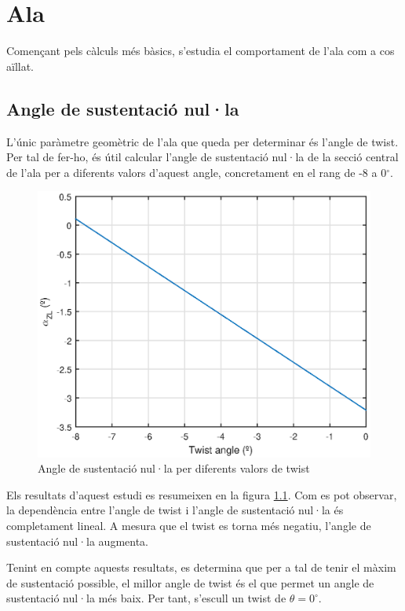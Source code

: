 \chapter{Ala}
Començant pels càlculs més bàsics, s'estudia el comportament de l'ala com a cos aïllat.

\section{Angle de sustentació nul·la}
L'únic paràmetre geomètric de l'ala que queda per determinar és l'angle de twist. Per tal de fer-ho, és útil calcular l'angle de sustentació nul·la de la secció central de l'ala per a diferents valors d'aquest angle, concretament en el rang de -8 a 0$^{\circ}$.

\begin{figure}[h]
	\centering
	\includegraphics{./plots/zlangle}
	\caption{Angle de sustentació nul·la per diferents valors de twist}
	\label{zla}
\end{figure}

Els resultats d'aquest estudi es resumeixen en la figura \ref{zla}. Com es pot observar, la dependència entre l'angle de twist i l'angle de sustentació nul·la és completament lineal. A mesura que el twist es torna més negatiu, l'angle de sustentació nul·la augmenta.

Tenint en compte aquests resultats, es determina que per a tal de tenir el màxim de sustentació possible, el millor angle de twist és el que permet un angle de sustentació nul·la més baix. Per tant, s'escull un twist de $\theta=0^{\circ}$.

